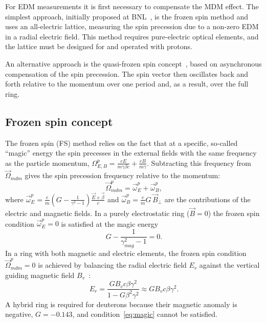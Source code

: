 \documentclass[%
  aps,
  pra,
  preprint,
  a4paper,
  amsmath,
  amssymb,
  floatfix,
  longbibliography,
  superscriptaddress
]{revtex4-2}
\begin{document}
For EDM measurements it is first necessary to compensate the MDM effect. The
simplest approach, initially proposed at BNL~\cite{srEDM:2008_deuteron_proposal}, is the frozen
spin method and uses an all-electric lattice, measuring the spin precession due
to a non-zero EDM in a radial electric field. This method requires
pure-electric optical elements, and the lattice must be designed for and
operated with protons.

An alternative approach is the quasi-frozen spin
concept~\cite{Senichev:2016rez}, based on asynchronous compensation of the spin
precession. The spin vector then oscillates back and forth relative to the
momentum over one period and, as a result, over the full ring.

\subsection{Frozen spin concept}

The frozen spin (FS) method relies on the fact that at a specific, so-called
``magic'' energy the spin precesses in the external fields with the same
frequency as the particle momentum,
$\Omega^{p}_{E,B} = \frac{eE}{m\gamma\beta c} + \frac{eB}{m\gamma}$.
Subtracting this frequency from $\vec{\Omega}_{mdm}$ gives the spin precession
frequency relative to the momentum:
\begin{equation}
  \vec{\Omega}^{p}_{mdm} = \vec{\omega}^{p}_{E} + \vec{\omega}^{p}_{B},
  \label{eq:omega_p}
\end{equation}
where
$\vec{\omega}^{p}_{E} = \frac{e}{m}\left(G-\frac{1}{\gamma^2-1}\right)\frac{\vec{E}\times\vec{\beta}}{c}$
and $\vec{\omega}^{p}_{B} = \frac{e}{m}G\,\vec{B}_{\perp}$ are the
contributions of the electric and magnetic fields. In a purely electrostatic
ring ($\vec{B}=0$) the frozen spin condition $\vec{\omega}^{p}_{E} = 0$ is
satisfied at the magic energy
\begin{equation}
  G - \frac{1}{\gamma_{mag}^2-1} = 0 .
  \label{eq:magic}
\end{equation}
In a ring with both magnetic and electric elements, the frozen spin condition
$\vec{\Omega}^{p}_{mdm}=0$ is achieved by balancing the radial electric field
$E_r$ against the vertical guiding magnetic field $B_v$~\cite{srEDM:2008_deuteron_proposal}:
\begin{equation}
  E_r = \frac{G B_v c\beta\gamma^2}{1-G\beta^2\gamma^2} \approx G B_v c\beta\gamma^2 .
  \label{eq:fs_hybrid}
\end{equation}
A hybrid ring is required for deuterons because their magnetic anomaly is
negative, $G = -0.143$, and condition~\eqref{eq:magic} cannot be satisfied.
\end{document}
